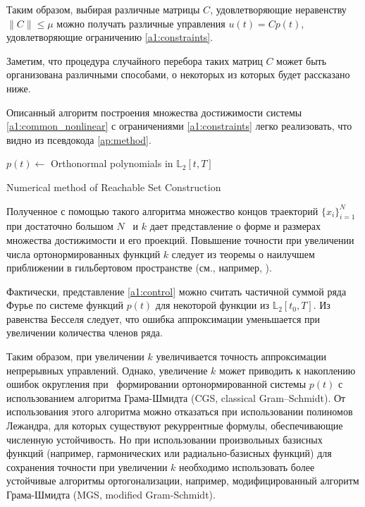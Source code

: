 \documentclass[../main.tex]{subfiles}
\begin{document}
 Таким образом, выбирая различные матрицы $C$, удовлетворяющие неравенству $\| C\| \leqslant \mu $ можно получать различные управления $u(t) = C p(t)$, удовлетворяющие ограничению \eqref{a1:constraints}.
 
 Заметим, что процедура случайного перебора таких матриц $C$ может быть организована различными способами, о некоторых из которых будет рассказано ниже.
 
 Описанный алгоритм построения множества достижимости системы \eqref{a1:common_nonlinear} с ограничениями \eqref{a1:constraints} легко реализовать, что видно из псевдокода \ref{ap:method}.
 \begin{algorithm}[hbt!]
 	$p(t) \gets $ Orthonormal polynomials in $\mathbb{L}_2[t,T]$ \;
 	\caption{Numerical method of Reachable Set Construction}
 	 \label{ap:method}
 \end{algorithm}
 
 Полученное с помощью такого алгоритма множество концов траекторий $\{x_i\}_{i = 1}^{N}$ при достаточно большом $N$  и $k$ дает представление о форме и размерах множества достижимости и его проекций. 
 Повышение точности при увеличении числа ортонормированных функций $k$ следует из теоремы о наилучшем приближении в гильбертовом пространстве (см., например, \cite{Kolmogorov}). 
 
 Фактически, представление \eqref{a1:control} можно считать частичной суммой ряда Фурье по системе функций $p(t)$ для некоторой функции из $\mathbb{L}_2[t_0, {T}]$. 
 Из равенства Бесселя следует, что ошибка аппроксимации уменьшается при увеличении количества членов ряда. 
 
 Таким образом, при увеличении $k$ увеличивается точность аппроксимации непрерывных управлений. 
 Однако, увеличение $k$ может приводить к накоплению ошибок округления при  формировании ортонормированной системы $p(t)$ с использованием алгоритма Грама-Шмидта (CGS, classical Gram–Schmidt). 
 От использования этого алгоритма можно отказаться при использовании полиномов Лежандра, для которых существуют рекуррентные формулы, обеспечивающие численную устойчивость. 
 Но при использовании произвольных базисных функций (например, гармонических или радиально-базисных функций) для сохранения точности при увеличении $k$ необходимо использовать более устойчивые алгоритмы ортогонализации, например, модифицированный алгоритм Грама-Шмидта (MGS, modified Gram-Schmidt).
 
\end{document}
